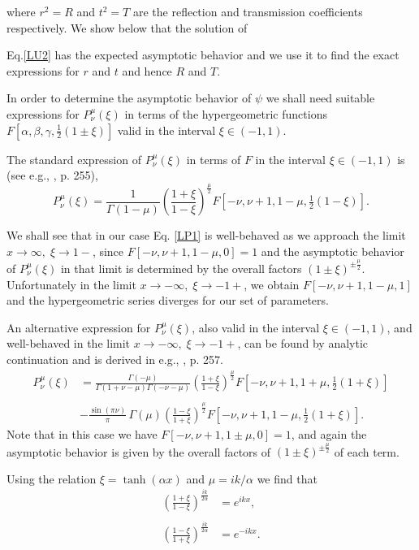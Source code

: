 \documentclass{article}
\numberwithin{equation}{section}
\begin{document}
where $r^2=R$ and $t^2=T$ are the reflection and transmission coefficients respectively.  We show below that the solution of {Eq.\eqref{LU2} has the expected asymptotic behavior and we use it to find the exact expressions for $r$ and $t$ and hence $R$ and $T$.

In order to determine the asymptotic behavior of $\psi$ we shall need suitable expressions for $P^{\mu}_{\nu}(\xi)$ in terms of the hypergeometric functions $F\left[\alpha,\beta,\gamma,\tfrac{1}{2}(1\pm\xi)\right]$ valid in the interval $\xi\in (-1,1)$.

The standard expression of $P^{\mu}_{\nu}(\xi)$ in terms of $F$ in the interval $\xi\in (-1,1)$ is (see e.g., \cite{WG10}, p. 255),
\begin{equation}
P^{\mu}_{\nu}(\xi)=\frac{1}{\Gamma(1-\mu)}\left(\frac{1+\xi}{1-\xi}\right)^{\frac{\mu}{2}}F\left[-\nu,\nu+1,1-\mu,\tfrac{1}{2}(1-\xi)\right].\label{LP1}
\end{equation}

We shall see that in our case Eq. \eqref{LP1} is well-behaved as we approach the limit $x\to \infty,\;\xi\to 1-$,  since $F\left[-\nu,\nu+1,1-\mu,0\right]=1$ and the asymptotic behavior of $P^{\mu}_{\nu}(\xi)$ in that limit  is determined by the overall factors $(1\pm\xi)^{\pm\frac{\mu}{2}}$.  Unfortunately in the limit $x\to -\infty,\;\xi\to -1+$, we obtain $F\left[-\nu,\nu+1,1-\mu,1\right]$ and the hypergeometric series diverges for our set of parameters.

An alternative expression for $P^{\mu}_{\nu}(\xi)$, also valid in the interval $\xi\in (-1,1)$, and well-behaved in the limit $x\to -\infty,\;\xi\to -1+$, can be found by analytic continuation and is derived in e.g., \cite{WG10}, p. 257.  \begin{align}
P^{\mu}_{\nu}(\xi)&=\frac{\Gamma(-\mu)}{\Gamma(1+\nu-\mu)\Gamma(-\nu-\mu)}\left(\frac{1+\xi}{1-\xi}\right)^{\frac{\mu}{2}}F\left[-\nu,\nu+1,1+\mu,\tfrac{1}{2}(1+\xi)\right]\nonumber\\\nonumber\\
&-\frac{\sin{(\pi\nu)}}{\pi}\,\Gamma(\mu)\left(\frac{1-\xi}{1+\xi}\right)^{\frac{\mu}{2}}F\left[-\nu,\nu+1,1-\mu,\tfrac{1}{2}(1+\xi)\right].\label{LP2}
\end{align}
Note that in this case we have $F\left[-\nu,\nu+1,1\pm\mu,0\right]=1$, and again the asymptotic behavior is given by the overall factors of $(1\pm\xi)^{\pm\frac{\mu}{2}}$ of each term.

Using the relation $\xi=\tanh{(\alpha x)}$ and $\mu=ik/\alpha$ we find that
\begin{align}
\left(\frac{1+\xi}{1-\xi}\right)^{\frac{ik}{2\alpha}}&=e^{ikx},\label{asy1}\\\nonumber\\
\left(\frac{1-\xi}{1+\xi}\right)^{\frac{ik}{2\alpha}}&=e^{-ikx}.\label{asy2}
\end{align}

}
\end{document}
